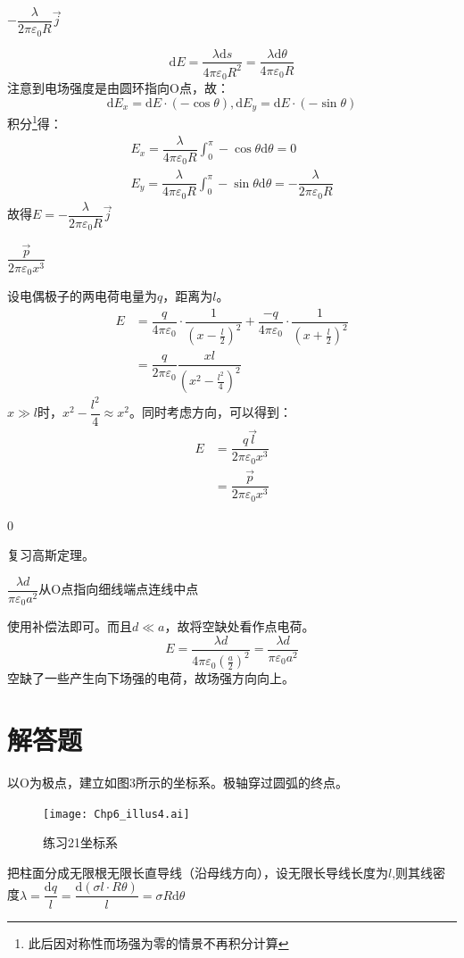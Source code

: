 \documentclass[b5paper,opensource,sourcefont,parskip]{qyxf-book}
\newcommand{\di}[1]{\mathrm{d}#1}
\begin{document}
$-\dfrac{\lambda}{2\pi\varepsilon_0R}\vec{j}$

\solve
\[
\di{E}=\dfrac{\lambda \di{s}}{4\pi \varepsilon_0 R^2}=\dfrac{\lambda \di{\theta}}{4\pi \varepsilon_0 R}
\]
注意到电场强度是由圆环指向O点，故：
\[
\di{E_x}=\di{E}\cdot (-\cos\theta),\di{E_y}=\di{E}\cdot (-\sin\theta)
\]
积分\footnote{此后因对称性而场强为零的情景不再积分计算}得：
\begin{gather*}
	E_x=\dfrac{\lambda}{4\pi \varepsilon_0 R}\int_0^{\pi} -\cos\theta\di{\theta}=0\\
	E_y=\dfrac{\lambda}{4\pi \varepsilon_0 R}\int_0^{\pi} -\sin\theta\di{\theta}=-\dfrac{\lambda}{2\pi\varepsilon_0R}
\end{gather*}
故得$E=-\dfrac{\lambda}{2\pi\varepsilon_0R}\vec{j}$

$\dfrac{\vec{p}}{2\pi\varepsilon_0x^3}$

\solve
设电偶极子的两电荷电量为$q$，距离为$l$。
\begin{align*}
	E&=\dfrac{q}{4\pi\varepsilon_0}\cdot \dfrac{1}{(x-\frac{l}{2})^2}+\dfrac{-q}{4\pi\varepsilon_0}\cdot \dfrac{1}{(x+\frac{l}{2})^2}\\
	&=\dfrac{q}{2\pi\varepsilon_0}\dfrac{xl}{{(x^2-\frac{l^2}{4})}^2}
\end{align*}
$x\gg l$时，$x^2-\dfrac{l^2}{4}\approx x^2$。同时考虑方向，可以得到：
\begin{align*}
	E&=\dfrac{q\vec{l}}{2\pi\varepsilon_0x^3}\\
	&=\dfrac{\vec{p}}{2\pi\varepsilon_0x^3}
\end{align*}

0

\solve
复习高斯定理。

$\dfrac{\lambda d}{\pi\varepsilon_0 a^2}$\quad 从O点指向细线端点连线中点

\solve
使用补偿法即可。而且$d\ll a$，故将空缺处看作点电荷。
\[
E=\dfrac{\lambda d}{4\pi\varepsilon_0{(\frac{a}{2})}^2}=\dfrac{\lambda d}{\pi\varepsilon_0 a^2}
\]
空缺了一些产生向下场强的电荷，故场强方向向上。

\section{解答题}



\solve
以O为极点，建立如图3所示的坐标系。极轴穿过圆弧的终点。
\begin{figure}[!htbp]
	\centering
	\texttt{[image: Chp6\_illus4.ai]}
	\caption{练习21\quad 坐标系}
\end{figure}
把柱面分成无限根无限长直导线（沿母线方向），设无限长导线长度为$l$,则其线密度$\lambda=\dfrac{\di{q}}{l}=\dfrac{\di{(\sigma l\cdot R\theta)}}{l}=\sigma R\di{\theta}$
\end{document}
